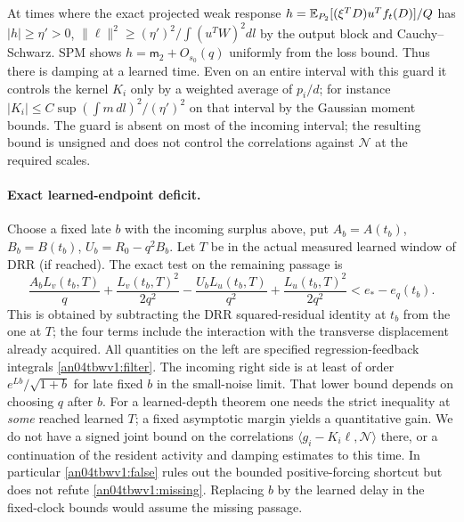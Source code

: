 \documentclass[11pt]{article}
\begin{document}
At times where the exact projected weak response
$h=\mathbb E_{P_2}[(\xi^TD)u^Tf_t(D)]/Q$ has $|h|\ge\eta'>0$,
$\|\ell\|^2\ge(\eta')^2/\int (u^TW)^2 dl$ by the output
block and Cauchy--Schwarz. SPM shows $h=\mathsf m_2+O_{s_0}(q)$
uniformly from the loss bound. Thus there is damping at a learned
time. Even on an entire interval with this guard it controls the
kernel $K_i$ only by a weighted average of $p_i/d$; for instance
$|K_i|\le C\sup(\int m\,dl)^2/(\eta')^2$ on that interval
by the Gaussian moment bounds. The guard is absent on most of
the incoming interval; the resulting bound is unsigned and does not
control the correlations against $\mathcal N$ at the required scales.

\paragraph{Exact learned-endpoint deficit.}
Choose a fixed late $b$ with the incoming surplus above, put
$A_b=A(t_b)$, $B_b=B(t_b)$, $U_b=R_0-q^2B_b$.
Let $T$ be in the actual measured learned window of DRR (if reached).
The exact test on the remaining passage is
\begin{equation}\label{an04tbwv1:missing}
 \frac{A_b L_v(t_b,T)}q+\frac{L_v(t_b,T)^2}{2q^2}
 -\frac{U_b L_u(t_b,T)}{q^2}+\frac{L_u(t_b,T)^2}{2q^2}
       < e_*-e_q(t_b).
\end{equation}
This is obtained by subtracting the DRR squared-residual identity
at $t_b$ from the one at $T$; the four terms include the interaction
with the transverse displacement already acquired. All quantities
on the left are specified regression-feedback integrals
\eqref{an04tbwv1:filter}. The incoming right side is at least of
order $e^{Lb}/\sqrt{1+b}$ for late fixed $b$ in the small-noise
limit. That lower bound depends on choosing $q$ after $b$.
For a learned-depth theorem one needs the strict inequality at
\emph{some} reached learned $T$; a fixed asymptotic margin yields
a quantitative gain. We do not have a signed joint bound on the
correlations $\langle g_i-K_i\ell,\mathcal N\rangle$ there,
or a continuation of the resident activity and damping estimates
to this time. In particular \eqref{an04tbwv1:false} rules out the
bounded positive-forcing shortcut but does not refute
\eqref{an04tbwv1:missing}. Replacing $b$ by the learned delay in
the fixed-clock bounds would assume the missing passage.
\end{document}
